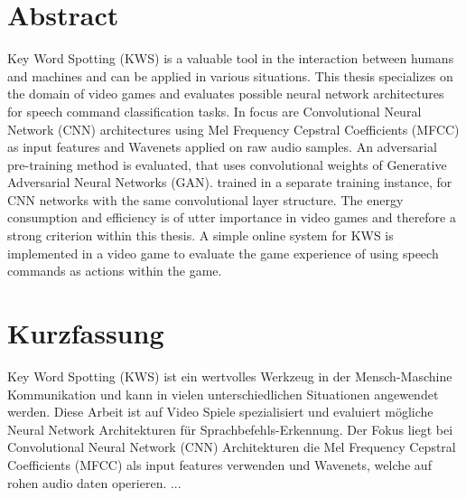
\chapter*{Abstract}\label{sec:shards_abstract}
\thesisStateReady
Key Word Spotting (KWS) is a valuable tool in the interaction between humans and machines and can be applied in various situations.
This thesis specializes on the domain of video games and evaluates possible neural network architectures for speech command classification tasks.
In focus are Convolutional Neural Network (CNN) architectures using Mel Frequency Cepstral Coefficients (MFCC) as input features and Wavenets applied on raw audio samples.
An adversarial pre-training method is evaluated, that uses convolutional weights of Generative Adversarial Neural Networks (GAN). trained in a separate training instance, for CNN networks with the same convolutional layer structure.
The energy consumption and efficiency is of utter importance in video games and therefore a strong criterion within this thesis.
A simple online system for KWS is implemented in a video game to evaluate the game experience of using speech commands as actions within the game.




\chapter*{Kurzfassung}
\thesisStateReady
Key Word Spotting (KWS) ist ein wertvolles Werkzeug in der Mensch-Maschine Kommunikation und kann in vielen unterschiedlichen Situationen angewendet werden.
Diese Arbeit ist auf Video Spiele spezialisiert und evaluiert mögliche Neural Network Architekturen für Sprachbefehls-Erkennung.
Der Fokus liegt bei Convolutional Neural Network (CNN) Architekturen die Mel Frequency Cepstral Coefficients (MFCC) als input features verwenden und Wavenets, welche auf rohen audio daten operieren.
...
